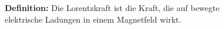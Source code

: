 \documentclass[preview]{standalone}
\begin{document}
\begin{center}
\textbf{Definition:} Die Lorentzkraft ist die Kraft, die auf bewegte\\elektrische Ladungen in einem Magnetfeld wirkt.
\end{center}
\end{document}

